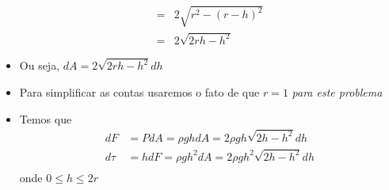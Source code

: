 \documentclass[brazilian,11pt]{article}
\begin{document}
\begin{itemize}
\[\begin{split}
                =&2\sqrt{r^2-(r-h)^2} \\
                =&2\sqrt{2rh-h^2}
            \end{split}
        \]
    \item Ou seja, \(dA=2\sqrt{2rh-h^2}dh\)
    \item Para simplificar as contas usaremos o 
        fato de que \(r=1\) \textit{para este problema}
    \item Temos que
        \begin{align*}
            dF&=PdA = \rho g h dA = 2\rho g h \sqrt{2h-h^2} dh \\
            d\tau&=h dF = \rho g h^2 dA= 2\rho g h^2 \sqrt{2h-h^2} dh \\
        \end{align*}
        onde \(0 \leq h \leq 2r\)


\end{itemize}
\end{document}
